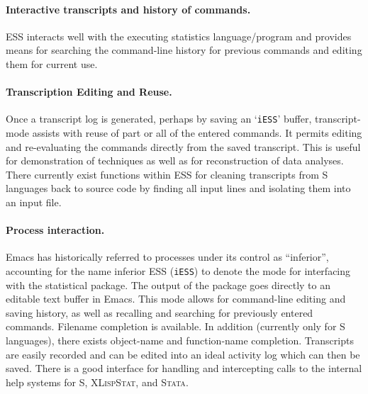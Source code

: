 \documentclass{article}
\newcommand*{\XLispStat}{\textsc{XLispStat}}
\newcommand*{\Stata}{\textsc{Stata}}
\newcommand{\stexttt}[1]{{\small\texttt{#1}}}
\newcommand{\file}[1]{`\stexttt{#1}'}
\begin{document}
\paragraph{Interactive transcripts and history of commands.} 
ESS interacts well with the
executing statistics language/program and provides means for searching
the command-line history for previous commands and editing them for
current use.

\paragraph{Transcription Editing and Reuse.}
Once a transcript log is generated, perhaps by saving an \file{iESS}
buffer, transcript-mode assists with reuse of part or all of the
entered commands.  It permits editing and re-evaluating the commands
directly from the saved transcript.  This is useful for
demonstration of techniques as well as for reconstruction of data
analyses.  There currently exist functions within ESS for cleaning
transcripts from S languages back to source code by finding all input
lines and isolating them into an input file.

\paragraph{Process interaction.}
Emacs has historically referred to processes under its control as
``inferior'', accounting for the name inferior ESS (\stexttt{iESS}) to
denote the mode for interfacing with the statistical package.  The
output of the package goes directly to an editable text buffer in Emacs.
This mode allows for command-line editing and saving history, as well as
recalling and searching for previously entered commands.  Filename
completion is available.  In addition (currently only for S languages),
there exists object-name and function-name completion.  Transcripts are
easily recorded and can be edited into an ideal activity log which can
then be saved.  There is a good interface for handling and intercepting
calls to the internal help systems for S, \XLispStat, and \Stata.

\end{document}

